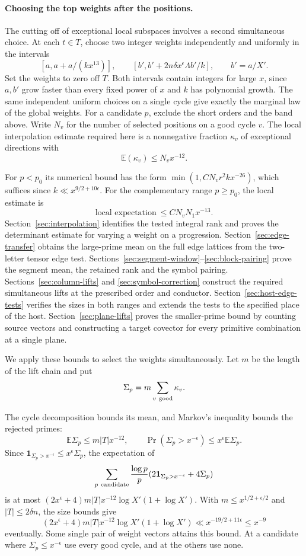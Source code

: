 \paragraph{Choosing the top weights after the positions.}
\label{par:top-weight-selection}
The cutting off of exceptional local subspaces involves a
second simultaneous choice. At each \(t\in T\), choose two
integer weights independently and uniformly in the intervals
\[
  [a,a+a/(kx^{13})],\qquad
  [b',b'+2n\delta x^\epsilon\Lambda b'/k],
  \qquad b'=a/X'.
\]
Set the weights to zero off \(T\). Both intervals contain
integers for large \(x\), since \(a,b'\) grow faster
than every fixed power of \(x\) and \(k\) has polynomial
growth. The same independent uniform choices on a single
cycle give exactly the marginal law of the global weights.
For a candidate \(p\), exclude the short orders and the
band above. Write \(N_v\) for the number of selected
positions on a good cycle \(v\). The local interpolation
estimate required here is a nonnegative fraction \(\kappa_v\)
of exceptional directions with
\[
                 \mathbb E(\kappa_v)\le N_v x^{-12}.
\]

For \(p<p_0\) its numerical bound has the form
\(\min(1,C N_v r^2 k x^{-26})\), which suffices since
\(k\ll x^{9/2+10\epsilon}\). For the complementary range \(p\ge p_0\), the local estimate is
\[
 \text{local expectation}\ \le C N_vN_1 x^{-13}.
\] Section~\ref{sec:interpolation} identifies
the tested integral rank and proves the determinant estimate
for varying a weight on a progression.
Section~\ref{sec:edge-transfer} obtains the large-prime mean
on the full edge lattices from the two-letter tensor edge
test. Sections~\ref{sec:segment-window}--\ref{sec:block-pairing} prove
the segment mean, the retained rank and the symbol pairing. Sections~\ref{sec:column-lifts} and \ref{sec:symbol-correction} construct
the required simultaneous lifts at the prescribed order and conductor.
Section~\ref{sec:host-edge-tests} verifies the sizes in both
ranges and extends the tests to the specified place of the host.
Section~\ref{sec:plane-lifts} proves the smaller-prime bound by
counting source vectors and constructing a target covector for
every primitive combination at a single plane.

We apply these bounds to select the weights simultaneously.
Let \(m\) be the length of the lift chain and put
\[
 \Sigma_p=m\sum_{v\ {\rm good}}\kappa_v.
\]

The cycle decomposition bounds its mean, and Markov's inequality bounds the rejected primes:
\[
 \mathbb E\Sigma_p\le m|T|x^{-12},\qquad \Pr(\Sigma_p>x^{-\epsilon})\le x^\epsilon\mathbb E\Sigma_p.
\]
Since
\(\mathbf1_{\Sigma_p>x^{-\epsilon}}\le x^\epsilon\Sigma_p\),
the expectation of
\[
   \sum_{p\ {\rm candidate}} \frac{\log p}{p}
       (2\mathbf1_{\Sigma_p>x^{-\epsilon}}+4\Sigma_p)
\]
is at most
\((2x^\epsilon+4)m|T|x^{-12}\log X'(1+\log X')\).
With \(m\le x^{1/2+\epsilon/2}\) and \(|T|\le 2\delta n\), the size bounds give
\[
 (2x^\epsilon+4)m|T|x^{-12}\log X'(1+\log X')\ll x^{-19/2+11\epsilon}\le x^{-9}
\]
eventually. Some single pair of
weight vectors attains this bound. At a candidate where
\(\Sigma_p\le x^{-\epsilon}\) use every good cycle, and
at the others use none.

